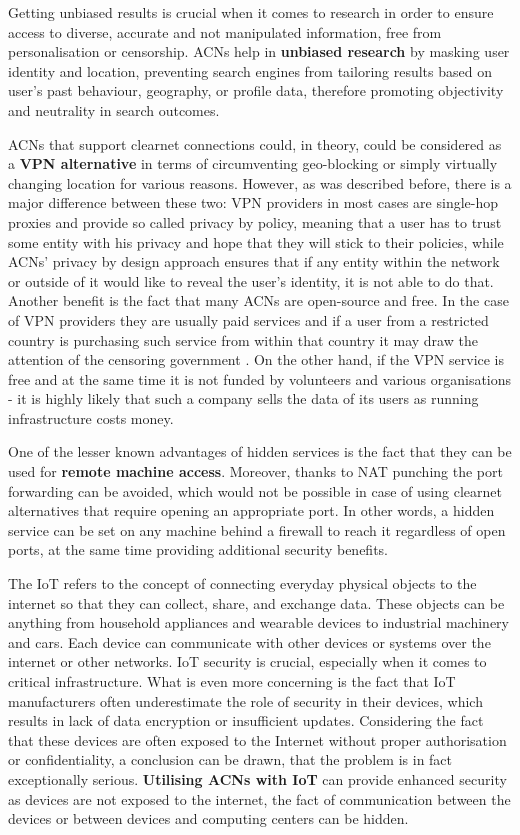 Getting unbiased results is crucial when it comes to research in order to ensure access to diverse, accurate and not manipulated information, free from personalisation or censorship. ACNs help in \textbf{unbiased research} by masking user identity and location, preventing search engines from tailoring results based on user’s past behaviour, geography, or profile data, therefore promoting objectivity and neutrality in search outcomes.

ACNs that support clearnet connections could, in theory, could be considered as a \textbf{VPN alternative} in terms of circumventing geo-blocking or simply virtually changing location for various reasons. However, as was described before, there is a major difference between these two: VPN providers in most cases are single-hop proxies and provide so called privacy by policy, meaning that a user has to trust some entity with his privacy and hope that they will stick to their policies, while ACNs’ privacy by design approach ensures that if any entity within the network or outside of it would like to reveal the user’s identity, it is not able to do that.
Another benefit is the fact that many ACNs are open-source and free. In the case of VPN providers they are usually paid services and if a user from a restricted country is purchasing such service from within that country it may draw the attention of the censoring government \cite{russia}. On the other hand, if the VPN service is free and at the same time it is not funded by volunteers and various organisations - it is highly likely that such a company sells the data of its users as running infrastructure costs money.

One of the lesser known advantages of hidden services is the fact that they can be used for \textbf{remote machine access}. Moreover, thanks to NAT punching the port forwarding can be avoided, which would not be possible in case of using clearnet alternatives that require opening an appropriate port. In other words, a hidden service can be set on any machine behind a firewall to reach it regardless of open ports, at the same time providing additional security benefits.

The IoT refers to the concept of connecting everyday physical objects to the internet so that they can collect, share, and exchange data. These objects can be anything from household appliances and wearable devices to industrial machinery and cars. Each device can communicate with other devices or systems over the internet or other networks. IoT security is crucial, especially when it comes to critical infrastructure. What is even more concerning is the fact that IoT manufacturers often underestimate the role of security in their devices, which results in lack of data encryption or insufficient updates. Considering the fact that these devices are often exposed to the Internet without proper authorisation or confidentiality, a conclusion can be drawn, that the problem is in fact exceptionally serious.
\textbf{Utilising ACNs with IoT} can provide enhanced security as devices are not exposed to the internet, the fact of communication between the devices or between devices and computing centers can be hidden.

